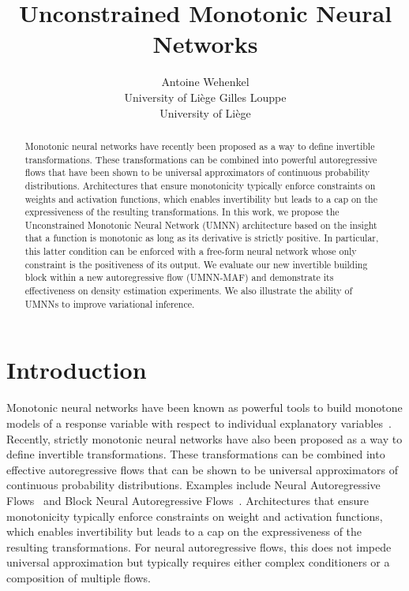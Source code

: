\documentclass{article}
\title{Unconstrained Monotonic Neural Networks}
\author{
    Antoine Wehenkel \\ University of Liège %
    \And Gilles Louppe \\ University of Liège %
}
\begin{document}
\maketitle

\begin{abstract}

Monotonic neural networks have recently been proposed as a way to define invertible transformations.
These transformations can be combined into powerful autoregressive flows that have been shown to be universal approximators of continuous probability distributions.
Architectures that ensure monotonicity typically enforce constraints on weights and activation functions, which enables invertibility but leads to a cap on the expressiveness of the resulting transformations.
In this work, we propose the Unconstrained Monotonic Neural Network (UMNN) architecture based on the insight that a function is monotonic as long as its derivative is strictly positive. In particular, this latter condition can be enforced with a free-form neural network whose only constraint is the positiveness of its output.
We evaluate our new invertible building block within a new autoregressive flow (UMNN-MAF) and demonstrate its effectiveness on density estimation experiments.
We also illustrate the ability of UMNNs to improve variational inference.
\end{abstract}



\section{Introduction}

Monotonic neural networks have been known as powerful tools to build monotone models of a response variable with respect to individual explanatory variables~\citep{NNMonotonicBackprop, NNmonotonicNips, daniels2010monotone, lattice1, lattice2}. Recently, strictly monotonic neural networks have also been proposed as a way to define invertible transformations. These transformations can be combined into effective autoregressive flows that can be shown to be universal approximators of continuous probability distributions. Examples include Neural Autoregressive Flows~\citep[NAF, ][]{NAF} and Block Neural Autoregressive Flows~\citep[B-NAF, ][]{BNAF}. Architectures that ensure monotonicity typically enforce constraints on weight and activation functions, which enables invertibility but %
leads to a cap on the expressiveness of the resulting transformations.
For neural autoregressive flows, this does not impede universal approximation but typically requires either complex conditioners or a composition of multiple flows.
\end{document}

